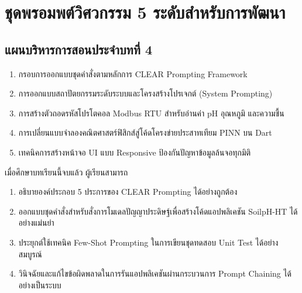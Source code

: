\chapter{ชุดพรอมพต์วิศวกรรม 5 ระดับสำหรับการพัฒนา}
\label{chap:ch04}

\section*{แผนบริหารการสอนประจำบทที่ 4}

\begin{tcolorbox}[
    enhanced, breakable,
    colback=white, colframe=rbruNavy,
    fonttitle=\bfseries\color{white},
    title={1. หัวข้อเนื้อหาประจำบท},
    arc=1.5mm, boxrule=0.8pt, leftrule=3.5mm
]
\begin{enumerate}
    \item กรอบการออกแบบชุดคำสั่งตามหลักการ CLEAR Prompting Framework
    \item การออกแบบสถาปัตยกรรมระดับระบบและโครงสร้างโปรเจกต์ (System Prompting)
    \item การสร้างตัวถอดรหัสโปรโตคอล Modbus RTU สำหรับอ่านค่า pH อุณหภูมิ และความชื้น
    \item การเปลี่ยนแบบจำลองคณิตศาสตร์ฟิสิกส์สู่โค้ดโครงข่ายประสาทเทียม PINN บน Dart
    \item เทคนิคการสร้างหน้าจอ UI แบบ Responsive ป้องกันปัญหาข้อมูลล้นจอทุกมิติ
\end{enumerate}
\end{tcolorbox}

\begin{tcolorbox}[
    enhanced, breakable,
    colback=white, colframe=rbruNavy,
    fonttitle=\bfseries\color{white},
    title={2. วัตถุประสงค์เชิงพฤติกรรม},
    arc=1.5mm, boxrule=0.8pt, leftrule=3.5mm
]
เมื่อศึกษาบทเรียนนี้จบแล้ว ผู้เรียนสามารถ
\begin{enumerate}
    \item อธิบายองค์ประกอบ 5 ประการของ CLEAR Prompting ได้อย่างถูกต้อง
    \item ออกแบบชุดคำสั่งสำหรับสั่งการโมเดลปัญญาประดิษฐ์เพื่อสร้างโค้ดแอปพลิเคชัน SoilpH-HT ได้อย่างแม่นยำ
    \item ประยุกต์ใช้เทคนิค Few-Shot Prompting ในการเขียนชุดทดสอบ Unit Test ได้อย่างสมบูรณ์
    \item วินิจฉัยและแก้ไขข้อผิดพลาดในการรันแอปพลิเคชันผ่านกระบวนการ Prompt Chaining ได้อย่างเป็นระบบ
\end{enumerate}
\end{tcolorbox}

